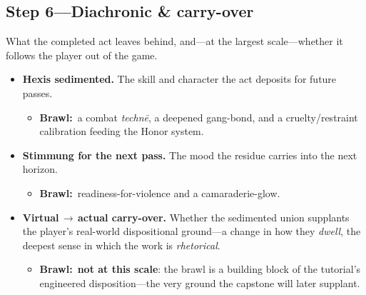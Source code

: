\documentclass[11pt]{article}
\newcommand{\inb}{\textbf{Brawl:}~}
\begin{document}
\subsection*{Step 6---Diachronic \& carry-over}
\noindent What the completed act leaves behind, and---at the largest scale---whether it follows the player out of the game.
\begin{itemize}
  \item \textbf{Hexis sedimented.} The skill and character the act deposits for future passes.
    \begin{itemize}\item \inb a combat \textit{techn\=e}, a deepened gang-bond, and a cruelty/restraint calibration feeding the Honor system.\end{itemize}
  \item \textbf{Stimmung for the next pass.} The mood the residue carries into the next horizon.
    \begin{itemize}\item \inb readiness-for-violence and a camaraderie-glow.\end{itemize}
  \item \textbf{Virtual\,$\to$\,actual carry-over.} Whether the sedimented union supplants the player's real-world dispositional ground---a change in how they \emph{dwell}, the deepest sense in which the work is \emph{rhetorical}.
    \begin{itemize}\item \inb \textbf{not at this scale}: the brawl is a building block of the tutorial's engineered disposition---the very ground the capstone will later supplant.\end{itemize}
\end{itemize}
\end{document}
